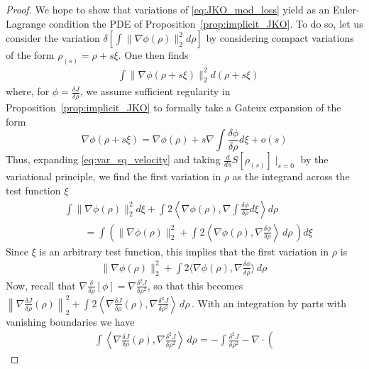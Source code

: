 \documentclass[reqno,11pt,letterpaper]{amsart}
\theoremstyle{plain}
\theoremstyle{definition}
\theoremstyle{remark}
\newcommand{\wadel}{\frac{\delta J}{\delta \rho}}
\begin{document}
\begin{proof}
    We hope to show that variations of \eqref{eq:JKO_mod_loss} yield as an Euler-Lagrange condition the PDE of Proposition~\ref{prop:implicit_JKO}. To do so, let us consider the variation $\delta \left[ \int \lVert \nabla \phi(\rho) \rVert_{2}^{2} d \rho \right]$ by considering compact variations of the form $\rho_{(s)}=\rho + s \xi$. One then finds
\begin{align}\label{eq:var_sq_velocity}
    &\int \lVert \nabla \phi(\rho + s \xi) \rVert_{2}^{2} d (\rho + s \xi)
\end{align}
where, for $\phi = \wadel$, we assume sufficient regularity in Proposition~\ref{prop:implicit_JKO} to formally take a Gateux expansion of the form
\[
    \nabla \phi(\rho + s \xi) = \nabla \phi (\rho) + s \nabla \int  \frac{\delta \phi}{\delta \rho} d\xi + o(s)
\]
Thus, expanding \eqref{eq:var_sq_velocity} and taking $\frac{d}{ds} S[\rho_{(s)}] \mid_{s=0}$ by the variational principle, we find the first variation in $\rho$ as the integrand across the test function $\xi$
\begin{align*}
    &\int 
      \lVert \nabla \phi (\rho) \rVert_{2}^{2} d \xi + \int 2 \left\langle \nabla \phi (\rho), 
    \nabla \int  \frac{\delta \phi}{\delta \rho} d\xi
     \right\rangle d\rho\\
     &\qquad = \int \left( 
      \lVert \nabla \phi (\rho) \rVert_{2}^{2} + \int 2 \left\langle \nabla \phi (\rho), 
    \nabla \frac{\delta \phi}{\delta \rho} 
     \right\rangle \, d\rho \, \right) d\xi
\end{align*}
Since $\xi$ is an arbitrary test function, this implies that the first variation in $\rho$ is
\begin{align*} 
      \lVert \nabla \phi (\rho) \rVert_{2}^{2} + \int 2 \langle \nabla \phi (\rho), 
    \nabla \frac{\delta \phi}{\delta \rho} 
     \rangle \, d\rho \, 
\end{align*}
Now, recall that $\nabla \frac{\delta }{\delta \rho}[\phi] = \nabla \frac{\delta^{2} J}{\delta \rho^{2}}$, so that this becomes $\left\lVert \nabla \frac{\delta J}{\delta \rho} (\rho) \right\rVert_{2}^{2} + \int 2 \left\langle \nabla \frac{\delta J}{\delta \rho} (\rho), 
    \nabla \frac{\delta^{2} J}{\delta \rho^{2}} 
     \right\rangle \, d\rho \,$. With an integration by parts with vanishing boundaries we have
\begin{align*}
    \int \left\langle \nabla \frac{\delta J}{\delta \rho} (\rho), 
    \nabla \frac{\delta^{2} J}{\delta \rho^{2}} 
     \right\rangle \, d\rho = - \int \frac{\delta^{2} J}{\delta \rho^{2}} -\nabla \cdot \left(

\end{align*}
\end{proof}
\end{document}
